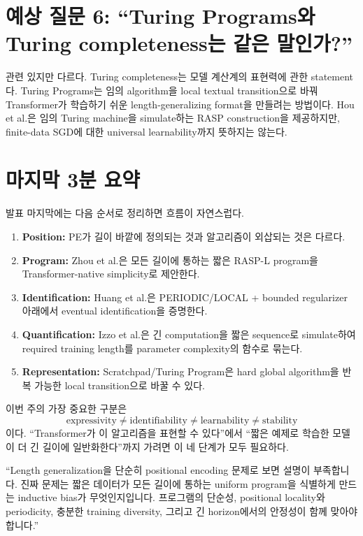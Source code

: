 \documentclass[11pt,a4paper,oneside,openany]{memoir}
\theoremstyle{definition}
\begin{document}
\section{예상 질문 6: ``Turing Programs와 Turing completeness는 같은 말인가?''}

관련 있지만 다르다. Turing completeness는 모델 계산계의 표현력에 관한 statement다.
Turing Programs는 임의 algorithm을 local textual transition으로 바꿔 Transformer가 학습하기 쉬운 length-generalizing format을 만들려는 방법이다.
Hou et al.은 임의 Turing machine을 simulate하는 RASP construction을 제공하지만, finite-data SGD에 대한 universal learnability까지 뜻하지는 않는다.

\section{마지막 3분 요약}

발표 마지막에는 다음 순서로 정리하면 흐름이 자연스럽다.

\begin{enumerate}
\item \textbf{Position:} PE가 길이 바깥에 정의되는 것과 알고리즘이 외삽되는 것은 다르다.
\item \textbf{Program:} Zhou et al.은 모든 길이에 통하는 짧은 RASP-L program을 Transformer-native simplicity로 제안한다.
\item \textbf{Identification:} Huang et al.은 PERIODIC/LOCAL + bounded regularizer 아래에서 eventual identification을 증명한다.
\item \textbf{Quantification:} Izzo et al.은 긴 computation을 짧은 sequence로 simulate하여 required training length를 parameter complexity의 함수로 묶는다.
\item \textbf{Representation:} Scratchpad/Turing Program은 hard global algorithm을 반복 가능한 local transition으로 바꿀 수 있다.
\end{enumerate}

\begin{keybox}
이번 주의 가장 중요한 구분은
\[
\text{expressivity}\ne\text{identifiability}\ne\text{learnability}\ne\text{stability}
\]
이다. ``Transformer가 이 알고리즘을 표현할 수 있다''에서 ``짧은 예제로 학습한 모델이 더 긴 길이에 일반화한다''까지 가려면 이 네 단계가 모두 필요하다.
\end{keybox}

\begin{presentbox}
``Length generalization을 단순히 positional encoding 문제로 보면 설명이 부족합니다. 진짜 문제는 짧은 데이터가 모든 길이에 통하는 uniform program을 식별하게 만드는 inductive bias가 무엇인지입니다. 프로그램의 단순성, positional locality와 periodicity, 충분한 training diversity, 그리고 긴 horizon에서의 안정성이 함께 맞아야 합니다.''
\end{presentbox}
\end{document}
